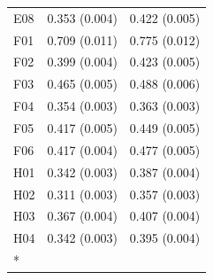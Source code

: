 \begin{longtable}[t]{lll}
E08 & 0.353 (0.004) & 0.422 (0.005)\\
F01 & 0.709 (0.011) & 0.775 (0.012)\\
F02 & 0.399 (0.004) & 0.423 (0.005)\\
F03 & 0.465 (0.005) & 0.488 (0.006)\\
F04 & 0.354 (0.003) & 0.363 (0.003)\\
F05 & 0.417 (0.005) & 0.449 (0.005)\\
F06 & 0.417 (0.004) & 0.477 (0.005)\\
H01 & 0.342 (0.003) & 0.387 (0.004)\\
H02 & 0.311 (0.003) & 0.357 (0.003)\\
H03 & 0.367 (0.004) & 0.407 (0.004)\\
H04 & 0.342 (0.003) & 0.395 (0.004)\\*
\end{longtable}
